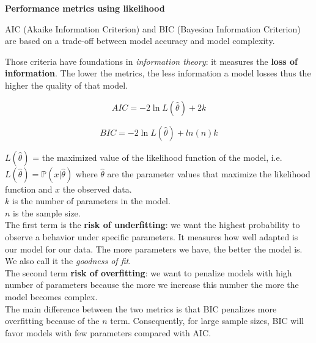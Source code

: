 {\fontsize{12pt}{22pt} \textbf{Performance metrics using likelihood}\par}

\vspace{5mm}

AIC (Akaike Information Criterion) and BIC (Bayesian Information Criterion) are based on a trade-off between model accuracy and model complexity.

Those criteria have foundations in \textit{information theory}: it measures the \textbf{loss of information}. The lower the metrics, the less information a model losses thus the higher the quality of that model.

$$AIC = -2\ln L(\hat \theta) + 2k$$

$$BIC = -2\ln L(\hat \theta) + ln(n)k$$

$L(\hat \theta)$ = the maximized value of the likelihood function of the model, i.e. $L(\hat \theta)= \mathbb{P}(x | \hat \theta)$ where $\hat \theta$ are the parameter values that maximize the likelihood function and $x$ the observed data. \\
$k$ is the number of parameters in the model. \\
$n$ is the sample size. \\


The first term is the \textbf{risk of underfitting}: we want the highest probability to observe a behavior under specific parameters. It measures how well adapted is our model for our data. The more parameters we have, the better the model is. We also call it the \textit{goodness of fit}. \\

The second term \textbf{risk of overfitting}: we want to penalize models with high number of parameters because the more we increase this number the more the model becomes complex. \\

The main difference between the two metrics is that BIC penalizes more overfitting because of the $n$ term. Consequently, for large sample sizes, BIC will favor models with few parameters compared with AIC.

\vspace{5mm}